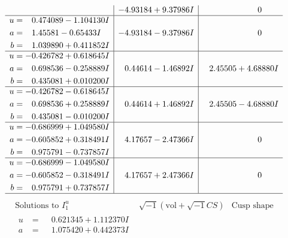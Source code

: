 \documentclass[1p]{elsarticle_modified}
\theoremstyle{definition}
\newcommand{\I}{\sqrt{-1}}
\begin{document}
$$\begin{array}{c|c|c}
 & -4.93184 + 9.37986 I & \phantom{-0.000000 } 0 \\ \hline\begin{aligned}
u &= \phantom{-}0.474089 - 1.104130 I \\
a &= \phantom{-}1.45581 - 0.65433 I \\
b &= \phantom{-}1.039890 + 0.411852 I\end{aligned}
 & -4.93184 - 9.37986 I & \phantom{-0.000000 } 0 \\ \hline\begin{aligned}
u &= -0.426782 + 0.618645 I \\
a &= \phantom{-}0.698536 - 0.258889 I \\
b &= \phantom{-}0.435081 + 0.010200 I\end{aligned}
 & \phantom{-}0.44614 - 1.46892 I & \phantom{-}2.45505 + 4.68880 I \\ \hline\begin{aligned}
u &= -0.426782 - 0.618645 I \\
a &= \phantom{-}0.698536 + 0.258889 I \\
b &= \phantom{-}0.435081 - 0.010200 I\end{aligned}
 & \phantom{-}0.44614 + 1.46892 I & \phantom{-}2.45505 - 4.68880 I \\ \hline\begin{aligned}
u &= -0.686999 + 1.049580 I \\
a &= -0.605852 + 0.318491 I \\
b &= \phantom{-}0.975791 - 0.737857 I\end{aligned}
 & \phantom{-}4.17657 - 2.47366 I & \phantom{-0.000000 } 0 \\ \hline\begin{aligned}
u &= -0.686999 - 1.049580 I \\
a &= -0.605852 - 0.318491 I \\
b &= \phantom{-}0.975791 + 0.737857 I\end{aligned}
 & \phantom{-}4.17657 + 2.47366 I & \phantom{-0.000000 } 0\\
 \hline 
 \end{array}$$\newpage$$\begin{array}{c|c|c}  
\text{Solutions to }I^u_{1}& \I (\text{vol} + \sqrt{-1}CS) & \text{Cusp shape}\\
 \hline 
\begin{aligned}
u &= \phantom{-}0.621345 + 1.112370 I \\
a &= \phantom{-}1.075420 + 0.442373 I \\

\end{aligned}
\end{array}$$
\end{document}
